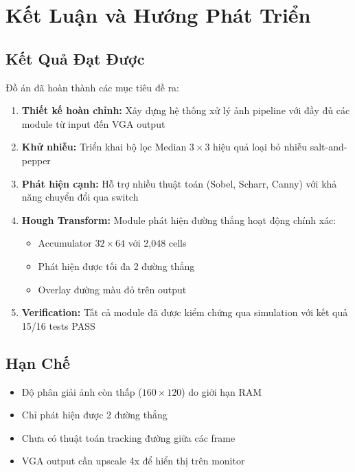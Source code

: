 \documentclass[12pt,a4paper]{report}
\begin{document}
\chapter{Kết Luận và Hướng Phát Triển}

\section{Kết Quả Đạt Được}

Đồ án đã hoàn thành các mục tiêu đề ra:

\begin{enumerate}
    \item \textbf{Thiết kế hoàn chỉnh:} Xây dựng hệ thống xử lý ảnh pipeline với đầy đủ các module từ input đến VGA output
    
    \item \textbf{Khử nhiễu:} Triển khai bộ lọc Median $3\times3$ hiệu quả loại bỏ nhiễu salt-and-pepper
    
    \item \textbf{Phát hiện cạnh:} Hỗ trợ nhiều thuật toán (Sobel, Scharr, Canny) với khả năng chuyển đổi qua switch
    
    \item \textbf{Hough Transform:} Module phát hiện đường thẳng hoạt động chính xác:
    \begin{itemize}
        \item Accumulator $32\times64$ với 2,048 cells
        \item Phát hiện được tối đa 2 đường thẳng
        \item Overlay đường màu đỏ trên output
    \end{itemize}
    
    \item \textbf{Verification:} Tất cả module đã được kiểm chứng qua simulation với kết quả 15/16 tests PASS
\end{enumerate}

\section{Hạn Chế}

\begin{itemize}
    \item Độ phân giải ảnh còn thấp ($160\times120$) do giới hạn RAM
    \item Chỉ phát hiện được 2 đường thẳng
    \item Chưa có thuật toán tracking đường giữa các frame
    \item VGA output cần upscale 4x để hiển thị trên monitor
\end{itemize}
\end{document}

